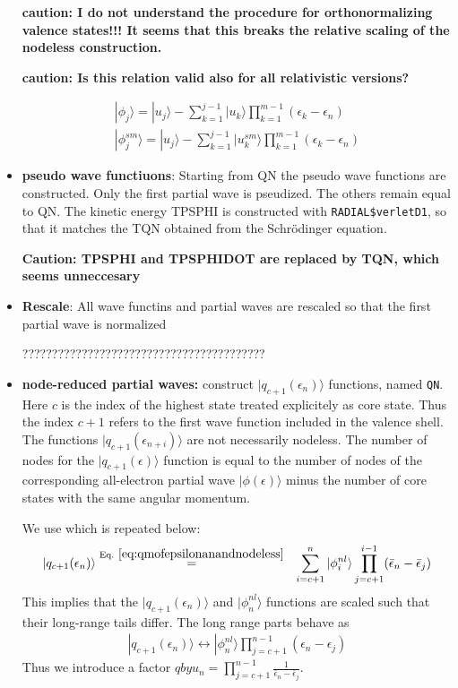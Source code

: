 \documentclass[11pt,a4paper]{report}
\begin{document}
\begin{itemize}
\textbf{caution: I do not understand the procedure for
  orthonormalizing valence states!!! It seems that this breaks the
  relative scaling of the nodeless construction.}

\textbf{caution: Is this relation valid also for all relativistic versions?}

\begin{eqnarray}
|\phi_j\rangle=|u_j\rangle
-\sum_{k=1}^{j-1}|u_k\rangle\prod_{k=1}^{m-1}(\epsilon_k-\epsilon_n)
\nonumber\\
|\phi^{sm}_j\rangle=|u_j\rangle
-\sum_{k=1}^{j-1}|u^{sm}_k\rangle\prod_{k=1}^{m-1}(\epsilon_k-\epsilon_n)
\end{eqnarray}

%
\item \textbf{pseudo wave functiuons}: Starting from QN the pseudo
  wave functions are constructed. Only the first partial wave is
  pseudized. The others remain equal to QN. The kinetic energy TPSPHI
  is constructed with \verb|RADIAL$verletD1|, so that it matches the
  TQN obtained from the Schr\"odinger equation.


\textbf{Caution: TPSPHI and TPSPHIDOT are replaced by TQN, which seems
  unneccesary}

\item \textbf{Rescale}: All wave functins and partial waves are
  rescaled so that the first partial wave is  normalized


?????????????????????????????????????????


\item \textbf{node-reduced partial waves:} construct
  $|q_{c+1}(\epsilon_{n})\rangle$ functions, named \verb|QN|. Here
  $c$ is the index of the highest state treated explicitely as core
  state. Thus the index $c+1$ refers to the first wave function
  included in the valence shell. The functions
  $|q_{c+1}(\epsilon_{n+i})\rangle$ are not necessarily nodeless.  The
  number of nodes for the $|q_{c+1}(\epsilon)\rangle$ function is
  equal to the number of nodes of the corresponding all-electron
  partial wave $|\phi(\epsilon)\rangle$ minus the number of core
  states with the same angular momentum.

We use  which is repeated below:
\begin{eqnarray*}
|q_{c+1}(\epsilon_n)\rangle&\eqrel{eq:qmofepsilonanandnodeless}{=}&
\sum_{i=c+1}^n|\phi^{nl}_i\rangle
\prod_{j=c+1}^{i-1}(\bar{\epsilon}_n-\bar{\epsilon}_j)
\end{eqnarray*}
This implies that the $|q_{c+1}(\epsilon_{n})\rangle$ and $|\phi^{nl}_n\rangle$
functions are scaled such that their long-range tails differ.
The long range parts behave as
\begin{eqnarray*}
|q_{c+1}(\epsilon_{n})\rangle\leftrightarrow
|\phi^{nl}_{n}\rangle
\prod_{j=c+1}^{n-1}(\epsilon_{n}-\epsilon_j)
\end{eqnarray*}
Thus we introduce a factor
$qbyu_n=\prod_{j=c+1}^{n-1}\frac{1}{\bar{\epsilon}_{n}-\bar{\epsilon}_j}$.  



\end{itemize}
\end{document}
